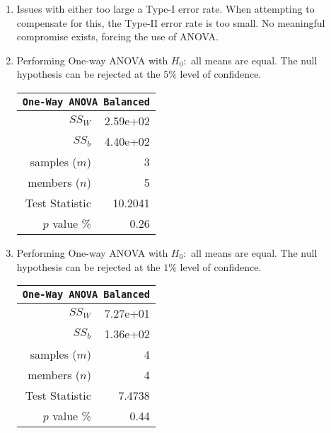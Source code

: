 \begin{enumerate}
	\item Issues with either too large a Type-I error rate. When attempting to compensate for this, the Type-II error rate is too small. No meaningful compromise exists, forcing the use of ANOVA.
	
	\item Performing One-way ANOVA with $ H_0 : $ all means are equal. The null hypothesis can be rejected at the $ 5\% $ level of confidence.
	
	\begin{table}[H]
		\centering
		\begin{tabular}{@{}rr@{}}
			\toprule
			\multicolumn{2}{c}{\texttt{One-Way ANOVA Balanced}} \\
			\midrule
			$SS_W$         &               2.59e+02 \\
			$SS_b$         &               4.40e+02 \\
			samples ($m$)  &                      3 \\
			members ($n$)  &                      5 \\
			Test Statistic &                10.2041 \\
			$p$ value \%   &                   0.26 \\
			\bottomrule
		\end{tabular}
		\bigskip
	\end{table}

	\item Performing One-way ANOVA with $ H_0 : $ all means are equal. The null hypothesis can be rejected at the $ 1\% $ level of confidence.
	
	\begin{table}[H]
		\centering
		\begin{tabular}{@{}rr@{}}
			\toprule
			\multicolumn{2}{c}{\texttt{One-Way ANOVA Balanced}} \\
			\midrule
			$SS_W$         &               7.27e+01 \\
			$SS_b$         &               1.36e+02 \\
			samples ($m$)  &                      4 \\
			members ($n$)  &                      4 \\
			Test Statistic &                 7.4738 \\
			$p$ value \%   &                   0.44 \\
			\bottomrule
		\end{tabular}
		
		\bigskip
	\end{table}


\end{enumerate}
